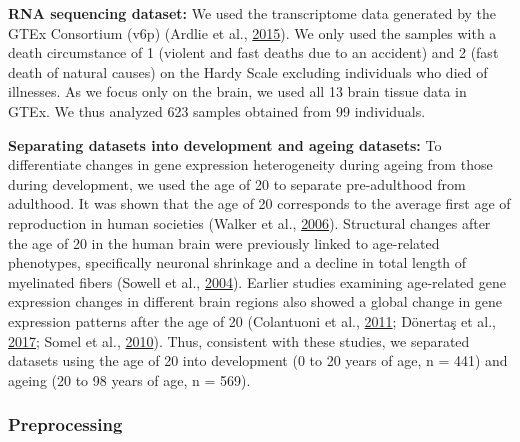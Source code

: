 \documentclass[12pt,twoside]{unicam}
\begin{document}
\textbf{RNA sequencing dataset:} We used the transcriptome data generated by the GTEx Consortium (v6p) (Ardlie et al., \protect\hyperlink{ref-Ardlie2015}{2015}). We only used the samples with a death circumstance of 1 (violent and fast deaths due to an accident) and 2 (fast death of natural causes) on the Hardy Scale excluding individuals who died of illnesses. As we focus only on the brain, we used all 13 brain tissue data in GTEx. We thus analyzed 623 samples obtained from 99 individuals.

\textbf{Separating datasets into development and ageing datasets:} To differentiate changes in gene expression heterogeneity during ageing from those during development, we used the age of 20 to separate pre-adulthood from adulthood. It was shown that the age of 20 corresponds to the average first age of reproduction in human societies (Walker et al., \protect\hyperlink{ref-Walker2006}{2006}). Structural changes after the age of 20 in the human brain were previously linked to age-related phenotypes, specifically neuronal shrinkage and a decline in total length of myelinated fibers (Sowell et al., \protect\hyperlink{ref-Sowell2004}{2004}). Earlier studies examining age-related gene expression changes in different brain regions also showed a global change in gene expression patterns after the age of 20 (Colantuoni et al., \protect\hyperlink{ref-Colantuoni2011}{2011}; Dönertaş et al., \protect\hyperlink{ref-Donertas2017}{2017}; Somel et al., \protect\hyperlink{ref-Somel2010}{2010}). Thus, consistent with these studies, we separated datasets using the age of 20 into development (0 to 20 years of age, n = 441) and ageing (20 to 98 years of age, n = 569).

\hypertarget{preprocessing}{%
\subsubsection{Preprocessing}\label{preprocessing}}
\end{document}
